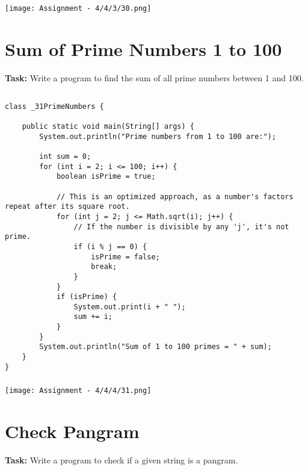 \documentclass[12pt,a4paper]{article}
\begin{document}
\subsubsection{}
\begin{center}
    \texttt{[image: Assignment - 4/4/3/30.png]}
\end{center}


\section{Sum of Prime Numbers 1 to 100}
\textbf{Task:} Write a program to find the sum of all prime numbers between 1 and 100.

\subsection{}
\begin{lstlisting}
class _31PrimeNumbers {

    public static void main(String[] args) {
        System.out.println("Prime numbers from 1 to 100 are:");
    
        int sum = 0;
        for (int i = 2; i <= 100; i++) {
            boolean isPrime = true;
    
            // This is an optimized approach, as a number's factors repeat after its square root.
            for (int j = 2; j <= Math.sqrt(i); j++) {
                // If the number is divisible by any 'j', it's not prime.
                if (i % j == 0) {
                    isPrime = false;
                    break; 
                }
            }
            if (isPrime) {
                System.out.print(i + " ");
                sum += i;
            }
        }
        System.out.println("Sum of 1 to 100 primes = " + sum);
    }
}

\end{lstlisting}

\subsubsection{}
\begin{center}
    \texttt{[image: Assignment - 4/4/4/31.png]}
\end{center}


\section{Check Pangram}
\textbf{Task:} Write a program to check if a given string is a pangram.
\end{document}
